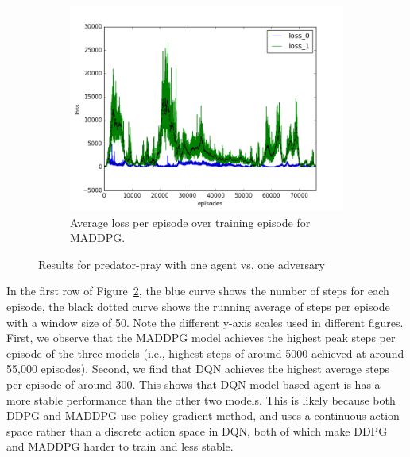 \begin{figure}[h]
\begin{subfigure}[h]{\figscale\linewidth}
    \includegraphics[trim=10 10 10 10,clip,width=\linewidth]
    {../results/maddpg_1vs1/loss.png}
    \caption{Average loss per episode over training episode for MADDPG.}
    \label{fig:maddpg-1vs1-loss}
  \end{subfigure}


  \caption{Results for predator-pray with one agent vs. one adversary}
  \label{fig:1vs1}
\end{figure}
\FloatBarrier


In the first row of Figure~\ref{fig:1vs1}, the blue curve shows the number of
steps for each episode, the black dotted curve shows the running average of
steps per episode with a window size of 50. Note the different y-axis scales
used in different figures. First, we observe that the MADDPG model achieves the
highest peak steps per episode of the three models (i.e., highest steps of
around 5000 achieved at around 55,000 episodes). Second, we find that DQN
achieves the highest average steps per episode of around 300. This shows that
DQN model based agent is has a more stable performance than the other two
models. This is likely because both DDPG and MADDPG use policy gradient method,
and uses a continuous action space rather than a discrete action space in DQN,
both of which make DDPG and MADDPG harder to train and less stable.

